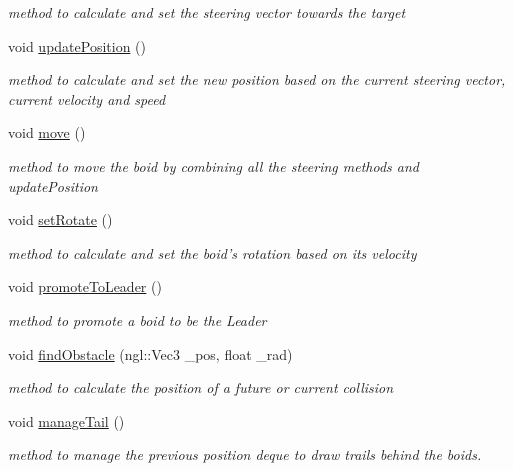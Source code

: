 \begin{DoxyCompactItemize}
\begin{DoxyCompactList}\small\item\em method to calculate and set the steering vector towards the target \item\end{DoxyCompactList}\item 
void \hyperlink{classBoid_a9133cb1a761dbbd80a535b4f5576dd00}{updatePosition} ()
\begin{DoxyCompactList}\small\item\em method to calculate and set the new position based on the current steering vector, current velocity and speed \item\end{DoxyCompactList}\item 
void \hyperlink{classBoid_ad84ed9152d035b542921547f289024eb}{move} ()
\begin{DoxyCompactList}\small\item\em method to move the boid by combining all the steering methods and updatePosition \item\end{DoxyCompactList}\item 
void \hyperlink{classBoid_a03d008ad343ad4a7d2c6d3ba3c6556ee}{setRotate} ()
\begin{DoxyCompactList}\small\item\em method to calculate and set the boid's rotation based on its velocity \item\end{DoxyCompactList}\item 
void \hyperlink{classBoid_af9b67d9a80f8c04b781245fed2d04c82}{promoteToLeader} ()
\begin{DoxyCompactList}\small\item\em method to promote a boid to be the Leader \item\end{DoxyCompactList}\item 
void \hyperlink{classBoid_aafd5acdcef1b743451a383aa75fe47a2}{findObstacle} (ngl::Vec3 \_\-pos, float \_\-rad)
\begin{DoxyCompactList}\small\item\em method to calculate the position of a future or current collision \item\end{DoxyCompactList}\item 
void \hyperlink{classBoid_a16b7b70d5ab275ce479d04f33f5bc1b4}{manageTail} ()
\begin{DoxyCompactList}\small\item\em method to manage the previous position deque to draw trails behind the boids. \item\end{DoxyCompactList}\end{DoxyCompactItemize}


